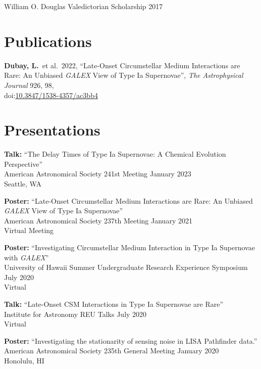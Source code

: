 \documentclass[12pt]{article}
\begin{document}
William O. Douglas Valedictorian Scholarship \hfill 2017

\section*{Publications}

\textbf{Dubay, L.}\ et al.\ 2022, ``Late-Onset Circumstellar Medium Interactions are Rare: An Unbiased \textit{GALEX} View of Type Ia Supernovae'', \textit{The Astrophysical Journal} 926, 98,\\ doi:\href{https://doi.org/10.3847/1538-4357/ac3bb4}{10.3847/1538-4357/ac3bb4}

\section*{Presentations}

\textbf{Talk:} ``The Delay Times of Type Ia Supernovae: A Chemical Evolution Perspective'' \\
American Astronomical Society 241st Meeting \hfill January 2023 \\
Seattle, WA
\vspace{12pt}

\textbf{Poster:} ``Late-Onset Circumstellar Medium Interactions are Rare: An Unbiased \textit{GALEX} View of Type Ia Supernovae'' \\
American Astronomical Society 237th Meeting \hfill January 2021 \\
Virtual Meeting
\vspace{12pt}

\textbf{Poster:} ``Investigating Circumstellar Medium Interaction in Type Ia
Supernovae with \textit{GALEX}'' \\
University of Hawaii Summer Undergraduate Research Experience Symposium \hfill
July 2020 \\
Virtual
\vspace{12pt}

\textbf{Talk:} ``Late-Onset CSM Interactions in Type Ia Supernovae are Rare'' \\
Institute for Astronomy REU Talks \hfill July 2020 \\
Virtual
\vspace{12pt}

\textbf{Poster:} ``Investigating the stationarity of sensing noise in LISA
Pathfinder data.''\\
American Astronomical Society 235th General Meeting \hfill January 2020 \\
Honolulu, HI
\vspace{12pt}
\end{document}
